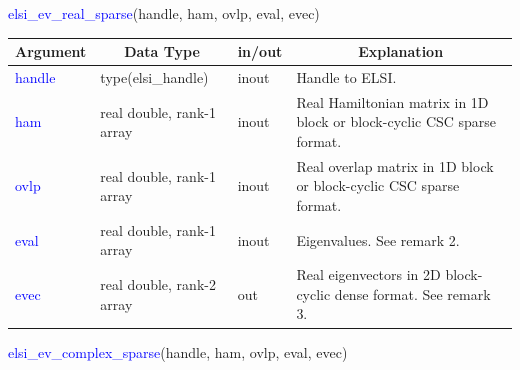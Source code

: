 \documentclass{report}
\begin{document}
\bigskip
\begin{labeling}{\hspace{6cm}}
\item [\hspace{0.3cm} \textcolor{blue}{elsi\_ev\_real\_sparse}(handle, ham, ovlp, eval, evec)]
\end{labeling}

\begin{table}[h]
\centering
\begin{tabular}[]{|p{20mm}|p{45mm}|p{15mm}|p{85mm}|}
\hline
\multicolumn{1}{|c|}{\textbf{Argument}} & \multicolumn{1}{c|}{\textbf{Data Type}} & \multicolumn{1}{c|}{\textbf{in/out}} & \multicolumn{1}{c|}{\textbf{Explanation}}\\
\hline
\textcolor{blue}{handle} & type(elsi\_handle)        & inout & Handle to ELSI.\\
\hline
\textcolor{blue}{ham}    & real double, rank-1 array & inout & Real Hamiltonian matrix in 1D block or block-cyclic CSC sparse format.\\
\hline
\textcolor{blue}{ovlp}   & real double, rank-1 array & inout & Real overlap matrix in 1D block or block-cyclic CSC sparse format.\\
\hline
\textcolor{blue}{eval}   & real double, rank-1 array & inout & Eigenvalues.  See remark 2.\\
\hline
\textcolor{blue}{evec}   & real double, rank-2 array & out   & Real eigenvectors in 2D block-cyclic dense format.  See remark 3.\\
\hline
\end{tabular}
\end{table}

\bigskip
\begin{labeling}{\hspace{6cm}}
\item [\hspace{0.3cm} \textcolor{blue}{elsi\_ev\_complex\_sparse}(handle, ham, ovlp, eval, evec)]
\end{labeling}
\end{document}
